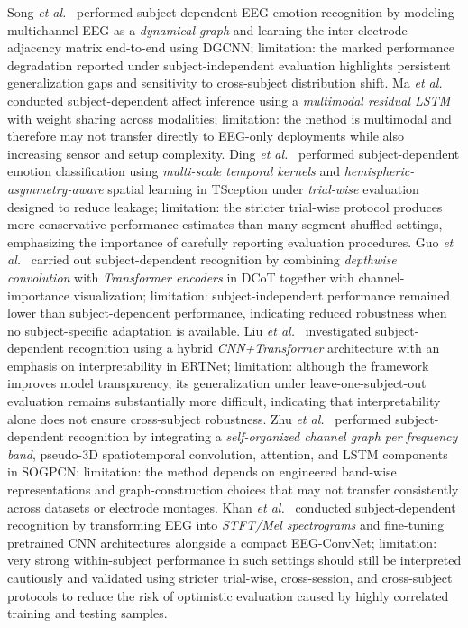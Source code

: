 \documentclass{WileyMSP-template}
\begin{document}
Song \textit{et al.}~\cite{song2020dgcnn} performed subject-dependent EEG emotion recognition by modeling multichannel EEG as a \emph{dynamical graph} and learning the inter-electrode adjacency matrix end-to-end using DGCNN; limitation: the marked performance degradation reported under subject-independent evaluation highlights persistent generalization gaps and sensitivity to cross-subject distribution shift. Ma \textit{et al.}~\cite{ma2019mmreslstm} conducted subject-dependent affect inference using a \emph{multimodal residual LSTM} with weight sharing across modalities; limitation: the method is multimodal and therefore may not transfer directly to EEG-only deployments while also increasing sensor and setup complexity. Ding \textit{et al.}~\cite{ding2022tsception} performed subject-dependent emotion classification using \emph{multi-scale temporal kernels} and \emph{hemispheric-asymmetry-aware} spatial learning in TSception under \emph{trial-wise} evaluation designed to reduce leakage; limitation: the stricter trial-wise protocol produces more conservative performance estimates than many segment-shuffled settings, emphasizing the importance of carefully reporting evaluation procedures. Guo \textit{et al.}~\cite{guo2022dcot} carried out subject-dependent recognition by combining \emph{depthwise convolution} with \emph{Transformer encoders} in DCoT together with channel-importance visualization; limitation: subject-independent performance remained lower than subject-dependent performance, indicating reduced robustness when no subject-specific adaptation is available. Liu \textit{et al.}~\cite{liu2024ertnet} investigated subject-dependent recognition using a hybrid \emph{CNN+Transformer} architecture with an emphasis on interpretability in ERTNet; limitation: although the framework improves model transparency, its generalization under leave-one-subject-out evaluation remains substantially more difficult, indicating that interpretability alone does not ensure cross-subject robustness. Zhu \textit{et al.}~\cite{zhu2024sogpcn} performed subject-dependent recognition by integrating a \emph{self-organized channel graph per frequency band}, pseudo-3D spatiotemporal convolution, attention, and LSTM components in SOGPCN; limitation: the method depends on engineered band-wise representations and graph-construction choices that may not transfer consistently across datasets or electrode montages. Khan \textit{et al.}~\cite{khan2024eegconvnet} conducted subject-dependent recognition by transforming EEG into \emph{STFT/Mel spectrograms} and fine-tuning pretrained CNN architectures alongside a compact EEG-ConvNet; limitation: very strong within-subject performance in such settings should still be interpreted cautiously and validated using stricter trial-wise, cross-session, and cross-subject protocols to reduce the risk of optimistic evaluation caused by highly correlated training and testing samples.
\end{document}
